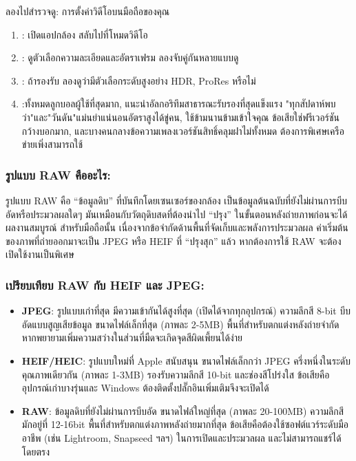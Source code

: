 \begin{tcbpractice}{ลองไปสำรวจดู: การตั้งค่าวิดีโอบนมือถือของคุณ}
\begin{enumerate}
  \item : เปิดแอปกล้อง สลับไปที่โหมดวิดีโอ
  \item : ดูตัวเลือกความละเอียดและอัตราเฟรม ลองจับคู่กันหลายแบบดู
  \item : ถ้ารองรับ ลองดูว่ามีตัวเลือกระดับสูงอย่าง HDR, ProRes หรือไม่
  \item :ทั้งหมดลูกบอลผู้ใช้ที่สุดมาก, แนะนำอัลกอริทึมสาธารณะรับรองที่สุดแข็งแรง "ทุกสัปดาห์พบว่า"และ"วันดัน"แม่นยำแน่นอนอัตราสูงได้ขู่คน, ใช้ข้ามนานข้ามเข้าใจคุณ ข้อเสียใช่ฟรีเวอร์ชันกว้างบอกมาก, และบางคนกลางข้อความเพลงเวอร์ชันสิทธิ์คลุมฝาไม่ทั้งหมด ต้องการพิเศษเครือข่ายเพิ่งสามารถใช้
\end{enumerate}

\end{tcbpractice}


\subsubsection*{รูปแบบ RAW คืออะไร:}

รูปแบบ RAW คือ “ข้อมูลดิบ” ที่บันทึกโดยเซนเซอร์ของกล้อง เป็นข้อมูลต้นฉบับที่ยังไม่ผ่านการบีบอัดหรือประมวลผลใดๆ มันเหมือนกับวัตถุดิบสดที่ต้องนำไป “ปรุง” ในขั้นตอนหลังถ่ายภาพก่อนจะได้ผลงานสมบูรณ์ สำหรับมือถือนั้น เนื่องจากข้อจำกัดด้านพื้นที่จัดเก็บและพลังการประมวลผล ค่าเริ่มต้นของภาพที่ถ่ายออกมาจะเป็น JPEG หรือ HEIF ที่ “ปรุงสุก” แล้ว หากต้องการใช้ RAW จะต้องเปิดใช้งานเป็นพิเศษ

\subsubsection*{เปรียบเทียบ RAW กับ HEIF และ JPEG:}

\begin{itemize}
  \item \textbf{JPEG}: รูปแบบเก่าที่สุด มีความเข้ากันได้สูงที่สุด (เปิดได้จากทุกอุปกรณ์) ความลึกสี 8-bit บีบอัดแบบสูญเสียข้อมูล ขนาดไฟล์เล็กที่สุด (ภาพละ 2-5MB) พื้นที่สำหรับตกแต่งหลังถ่ายจำกัด หากพยายามเพิ่มความสว่างในส่วนที่มืดจะเกิดจุดสีผิดเพี้ยนได้ง่าย
  \item \textbf{HEIF/HEIC}: รูปแบบใหม่ที่ Apple สนับสนุน ขนาดไฟล์เล็กกว่า JPEG ครึ่งหนึ่งในระดับคุณภาพเดียวกัน (ภาพละ 1-3MB) รองรับความลึกสี 10-bit และช่องสีโปร่งใส ข้อเสียคืออุปกรณ์เก่าบางรุ่นและ Windows ต้องติดตั้งปลั๊กอินเพิ่มเติมจึงจะเปิดได้
  \item \textbf{RAW}: ข้อมูลดิบที่ยังไม่ผ่านการบีบอัด ขนาดไฟล์ใหญ่ที่สุด (ภาพละ 20-100MB) ความลึกสีมักอยู่ที่ 12-16bit พื้นที่สำหรับตกแต่งภาพหลังถ่ายมากที่สุด ข้อเสียคือต้องใช้ซอฟต์แวร์ระดับมืออาชีพ (เช่น Lightroom, Snapseed ฯลฯ) ในการเปิดและประมวลผล และไม่สามารถแชร์ได้โดยตรง
\end{itemize}

